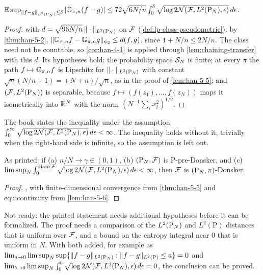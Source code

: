 \begin{lemma}
  \label{lem:han-5-6}
  $\mathbb{E}\sup_{\|f-g\|_{L^2(\mathrm{P}_N)}\le\delta}|\mathbb{G}_{\pi,n}(f-g)|\le72\sqrt{6N/n}\int_0^\delta\sqrt{\log2\mathcal{N}(\mathcal{F},L^2(\mathrm{P}_N),\epsilon)}\,d\epsilon$.
\end{lemma}
\begin{proof}
   with $d=\sqrt{96N/n}\,\|\cdot\|_{L^2(\mathrm{P}_N)}$ on $\mathcal{F}$ (\cref{def:lp-class-pseudometric}): by \cref{thm:han-5-2}, $\|\mathbb{G}_{\pi,n} f-\mathbb{G}_{\pi,n} g\|_{\psi_2}\le d(f,g)$, since $1+N/n\le2N/n$. The class need not be countable, so \cref{cor:han-4-1} is applied through \cref{lem:chaining-transfer} with this $d$. Its hypotheses hold: the probability space $\mathcal{S}_N$ is finite; at every $\pi$ the path $f\mapsto\mathbb{G}_{\pi,n} f$ is Lipschitz for $\|\cdot\|_{L^2(\mathrm{P}_N)}$ with constant $\sqrt n(N/n+1)=(N+n)/\sqrt n$, as in the proof of \cref{lem:han-5-5}; and $(\mathcal{F},L^2(\mathrm{P}_N))$ is separable, because $f\mapsto(f(z_1),\dots,f(z_N))$ maps it isometrically into $\mathbb{R}^N$ with the norm $(N^{-1}\sum_ix_i^2)^{1/2}$.
\end{proof}
\begin{remark}
  The book states the inequality under the assumption $\int_0^\infty\sqrt{\log2\mathcal{N}(\mathcal{F},L^2(\mathrm{P}_N),\epsilon)}\,d\epsilon<\infty$. The inequality holds without it, trivially when the right-hand side is infinite, so the assumption is left out.
\end{remark}

\begin{theorem}
  \label{thm:han-5-12}
  \notready
  As printed: if (a) $n/N\to\gamma\in(0,1)$, (b) $(\mathrm{P}_N,\mathcal{F})$ is $\mathrm P$-pre-Donsker, and (c) $\limsup_N\int_0^{\operatorname{diam}\mathcal{F}}\sqrt{\log2\mathcal{N}(\mathcal{F},L^2(\mathrm{P}_N),\epsilon)}\,d\epsilon<\infty$, then $\mathcal{F}$ is $(\mathrm{P}_N,\pi)$-Donsker.
\end{theorem}
\begin{proof}
  , with finite-dimensional convergence from \cref{thm:han-5-5} and equicontinuity from \cref{lem:han-5-6}.
\end{proof}
\begin{remark}
  Not ready: the printed statement needs additional hypotheses before it can be formalized. The proof needs a comparison of the $L^2(\mathrm{P}_N)$ and $L^2(\mathrm P)$ distances that is uniform over $\mathcal{F}$, and a bound on the entropy integral near $0$ that is uniform in $N$. With both added, for example as $\lim_{a\to0}\limsup_N\sup\{\|f-g\|_{L^2(\mathrm{P}_N)}:\|f-g\|_{L^2(\mathrm P)}\le a\}=0$ and $\lim_{b\to0}\limsup_N\int_0^b\sqrt{\log2\mathcal{N}(\mathcal{F},L^2(\mathrm{P}_N),\epsilon)}\,d\epsilon=0$, the conclusion can be proved.
\end{remark}

